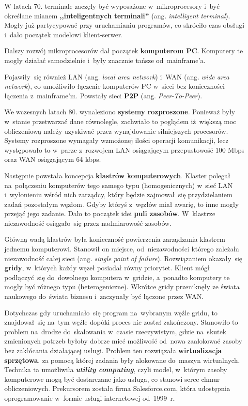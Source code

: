 \documentclass[12pt,a4paper,twoside,titlepage,openright]{book}
\begin{document}
W latach 70. terminale zaczęły być wyposażone w~mikroprocesory i~być określane mianem \textbf{,,inteligentnych terminali''} (ang. \textit{intelligent terminal}). Mogły już partycypować przy uruchamianiu programów, co skróciło czas obsługi i~dało początek modelowi klient-serwer.

Dalszy rozwój mikroprocesorów dał początek \textbf{komputerom PC}. Komputery te mogły działać samodzielnie i~były znacznie tańsze od~mainframe'a.

Pojawiły~się również LAN (ang. \textit{local area network}) i~WAN (ang. \textit{wide area network}), co umożliwiło łączenie komputerów PC w~sieci bez konieczności łączenia z~mainframe'm. Powstały sieci \textbf{P2P} (ang. \textit{Peer-To-Peer}).

We wczesnych latach 80. wynaleziono \textbf{systemy rozproszone}. Ponieważ były w~stanie przetwarzać dane równolegle, zachwiało to poglądem iż~większą moc obliczeniową należy uzyskiwać przez wynajdowanie silniejszych procesorów. Systemy rozproszone wymagały wzmożonej ilości operacji komunikacji, lecz występowało to w~parze z~rozwojem LAN osiągającym przepustowość 100 Mbps oraz WAN osiągającym 64 kbps.

Następnie powstała koncepcja \textbf{klastrów komputerowych}. Klaster polegał na~połączeniu komputerów tego samego typu (homogenicznych) w~sieć LAN i~wyłonieniu wśród nich zarządcy, który będzie zajmował~się przydzielaniem zadań pozostałym węzłom. Gdyby któryś z~węzłów miał awarię, to inne mogły przejąć jego zadanie. Dało to początek idei \textbf{puli zasobów}. W~klastrze niezawodność osiągało~się przez nadmiarowość zasobów.

Główną wadą klastrów była konieczność powierzenia zarządzania klastrem jednemu komputerowi. Stanowił on miejsce, od~niezawodności którego zależała niezawodność całej sieci (ang. \textit{single point of failure}). Rozwiązaniem okazały~się \textbf{gridy}, w~których każdy węzeł posiadał równy priorytet. Klient mógł podłączyć~się do~dowolnego komputera w~gridzie, a~ponadto komputery te mogły być różnego typu (heterogeniczne). Wkrótce gridy przeniknęły ze świata naukowego do~świata biznesu i~zaczynały być łączone przez WAN.

Dotychczas gdy uruchamiało~się program na~wybranym węźle gridu, to znajdował~się na~tym węźle dopóki proces nie został zakończony. Stanowiło to problem na~drodze do~skalowania w~czasie rzeczywistym, gdzie na~skutek zmienionych potrzeb byłoby dobrze mieć możliwość od~nowa zaalokować zasoby bez zakłócania działającej usługi. Problem ten rozwiązała \textbf{wirtualizacja sprzętowa}, za pomocą której zadania były alokowane do~maszyn wirtualnych. Technika ta umożliwiła \textbf{\textit{utility computing}}, czyli model, w~którym zasoby komputerowe mogą być dostarczane jako usługa, co stanowi serce chmur obliczeniowych. Prekursorem została firma Salesforce.com, która udostępnia oprogramowanie w~formie usługi internetowej od~1999~r.
\end{document}
